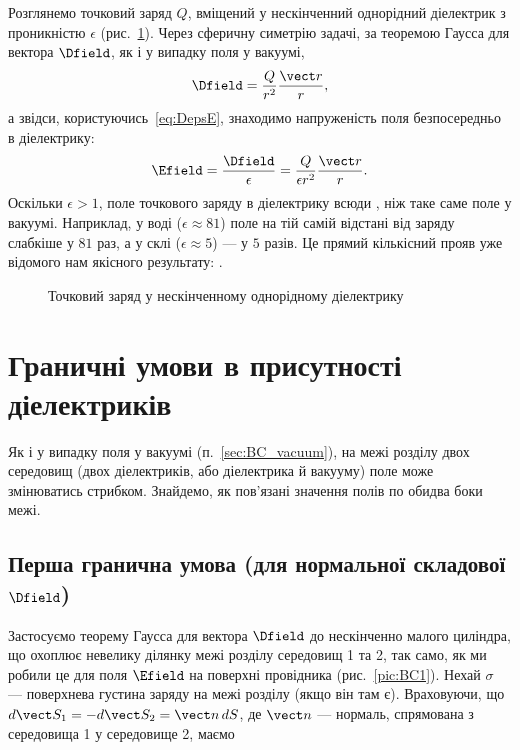  Розглянемо точковий заряд $Q$, вміщений у нескінченний однорідний діелектрик з проникністю $\epsilon$
(рис.~\ref{pic:PointChargeDielectric}). Через сферичну симетрію
задачі, за теоремою Гаусса для вектора $\Dfield$, як і у випадку поля у вакуумі,
\begin{equation*}
	\Dfield = \frac{Q}{r^2}\frac{\vect r}{r},
\end{equation*}
а звідси, користуючись~\eqref{eq:DepsE}, знаходимо напруженість поля безпосередньо в діелектрику:
\begin{equation*}
	\Efield = \frac{\Dfield}{\epsilon} = \frac{Q}{\epsilon r^2}\frac{\vect r}{r}.
\end{equation*}
Оскільки $\epsilon > 1$, поле точкового заряду в діелектрику всюди , ніж таке саме поле у вакуумі. Наприклад, у воді
($\epsilon \approx 81$) поле на тій самій відстані від заряду слабкіше у $81$ раз, а у склі ($\epsilon \approx 5$) --- у $5$ разів. Це прямий
кількісний прояв уже відомого нам якісного результату: .

\begin{figure}\centering
	\caption{Точковий заряд у нескінченному однорідному діелектрику\label{pic:PointChargeDielectric}}
\end{figure}


\section{Граничні умови в присутності діелектриків}

Як і у випадку поля у вакуумі (п.~\ref{sec:BC_vacuum}), на межі розділу двох середовищ (двох діелектриків, або діелектрика й вакууму) поле може змінюватись
стрибком. Знайдемо, як пов'язані значення полів по обидва боки межі.


\subsection*{Перша гранична умова (для нормальної складової $\Dfield$)}

Застосуємо теорему Гаусса для вектора $\Dfield$ до нескінченно малого циліндра,
що охоплює невелику ділянку межі розділу середовищ 1 та 2, так само, як ми робили це для поля $\Efield$ на поверхні провідника (рис.~\ref{pic:BC1}).
Нехай $\sigma$ ---
поверхнева густина  заряду на межі розділу (якщо він там є). Враховуючи, що $d\vect S_1 = -d\vect S_2 = \vect n\, dS$, де $\vect n$
--- нормаль, спрямована з середовища 1 у середовище 2, маємо

